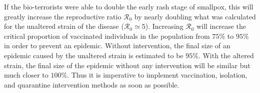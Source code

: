 If the bio-terrorists were able to double the early rash stage of smallpox, this will greatly increase the reproductive ratio $\mathcal R_0$ by nearly doubling what was calculated for the unaltered strain of the disease ($\mathcal R_0 \simeq 5$). Increasing $\mathcal R_0$ will increase the critical proportion of vaccinated individuals in the population from $75\%$ to $95\%$ in order to prevent an epidemic. Without intervention, the final size of an  epidemic caused by the unaltered strain is estimated to be $95\%$. 	With the altered strain, the final size of the epidemic without any intervention will be similar but much closer to $100\%$. Thus it is imperative to implement vaccination, isolation, and quarantine intervention methods as soon as possible.
